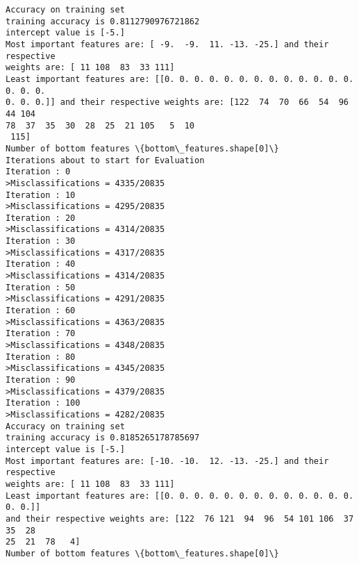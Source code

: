 \documentclass[11pt]{article}
\begin{document}
\begin{Verbatim}[commandchars=\\\{\}]
Accuracy on training set
training accuracy is 0.8112790976721862
intercept value is [-5.]
Most important features are: [ -9.  -9.  11. -13. -25.] and their respective
weights are: [ 11 108  83  33 111]
Least important features are: [[0. 0. 0. 0. 0. 0. 0. 0. 0. 0. 0. 0. 0. 0. 0. 0.
0. 0. 0.]] and their respective weights are: [122  74  70  66  54  96  44 104
78  37  35  30  28  25  21 105   5  10
 115]
Number of bottom features \{bottom\_features.shape[0]\}
Iterations about to start for Evaluation
Iteration : 0
>Misclassifications = 4335/20835
Iteration : 10
>Misclassifications = 4295/20835
Iteration : 20
>Misclassifications = 4314/20835
Iteration : 30
>Misclassifications = 4317/20835
Iteration : 40
>Misclassifications = 4314/20835
Iteration : 50
>Misclassifications = 4291/20835
Iteration : 60
>Misclassifications = 4363/20835
Iteration : 70
>Misclassifications = 4348/20835
Iteration : 80
>Misclassifications = 4345/20835
Iteration : 90
>Misclassifications = 4379/20835
Iteration : 100
>Misclassifications = 4282/20835
Accuracy on training set
training accuracy is 0.8185265178785697
intercept value is [-5.]
Most important features are: [-10. -10.  12. -13. -25.] and their respective
weights are: [ 11 108  83  33 111]
Least important features are: [[0. 0. 0. 0. 0. 0. 0. 0. 0. 0. 0. 0. 0. 0. 0.]]
and their respective weights are: [122  76 121  94  96  54 101 106  37  35  28
25  21  78   4]
Number of bottom features \{bottom\_features.shape[0]\}
    \end{Verbatim}
\end{document}
